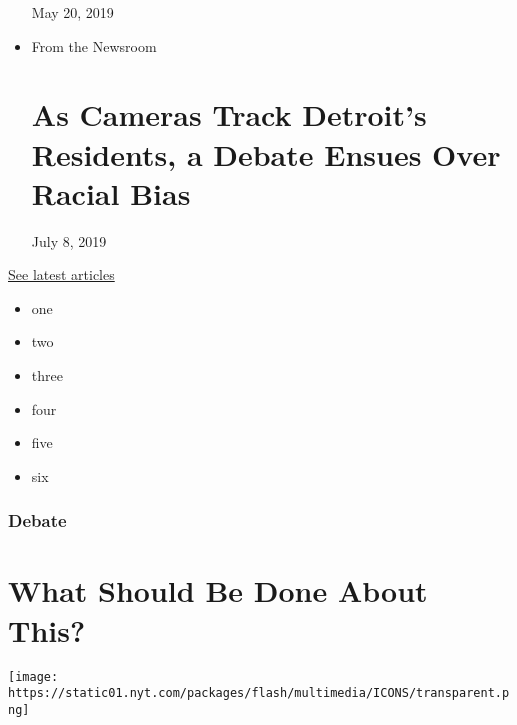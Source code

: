 \begin{itemize}
  May 20, 2019
\item
  From the Newsroom

  \href{https://www.nytimes.com/2019/07/08/us/detroit-facial-recognition-cameras.html?smid=nytcore-ios-share}{}

  \hypertarget{as-cameras-track-detroits-residents-a-debate-ensues-over-racial-bias}{%
  \section{As Cameras Track Detroit's Residents, a Debate Ensues Over
  Racial
  Bias}\label{as-cameras-track-detroits-residents-a-debate-ensues-over-racial-bias}}

  July 8, 2019
\end{itemize}

\href{https://nytimes.com/spotlight/privacy-project-personal-information}{See
latest articles}

\begin{itemize}
\tightlist
\item
  one
\item
  two
\item
  three
\item
  four
\item
  five
\item
  six
\end{itemize}

\hypertarget{debate-1}{%
\subsubsection{Debate}\label{debate-1}}

\hypertarget{what-should-be-done-about-this-1}{%
\section{What Should Be Done About
This?}\label{what-should-be-done-about-this-1}}

\texttt{[image: https://static01.nyt.com/packages/flash/multimedia/ICONS/transparent.png]}

